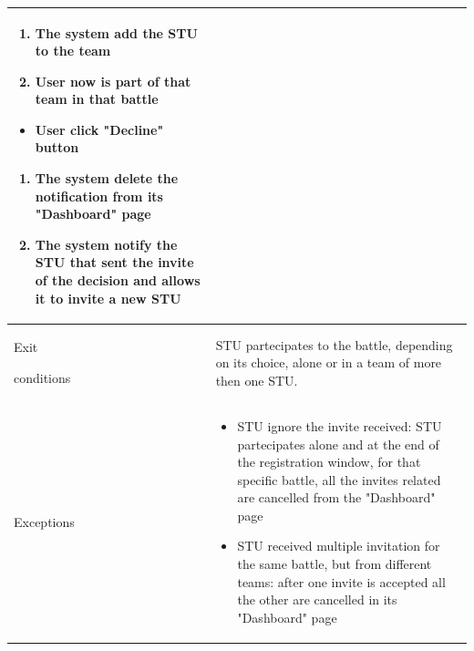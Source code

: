 \begin{center}
\begin{tabular}{| m{2cm} | m{10cm}|}
\begin{enumerate}
                                          \begin{enumerate}
                      \item The system add the STU to the team
                      \item User now is part of that team in that battle
                  \end{enumerate}
                                          \begin{itemize}
                      \item User click "Decline" button
                  \end{itemize}
                                          \begin{enumerate}
                      \item The system delete the notification from its "Dashboard" page
                      \item The system notify the STU that sent the invite of the decision and allows it to invite a new STU
                  \end{enumerate}
                                \end{enumerate}                                                                                  \\ \hline
        Exit \par conditions  & STU partecipates to the battle, depending on its choice, alone or in a team of more then one STU.                                                                                                \\ \hline
        Exceptions            & \begin{itemize}
                                    \item STU ignore the invite received: STU partecipates alone and at the end of the registration window, for that specific battle, all the invites related are cancelled from the "Dashboard" page
                                    \item STU received multiple invitation for the same battle, but from different teams: after one invite is accepted all the other are cancelled in its "Dashboard" page
                                \end{itemize} \\ \hline
    \end{tabular}
\end{center}

